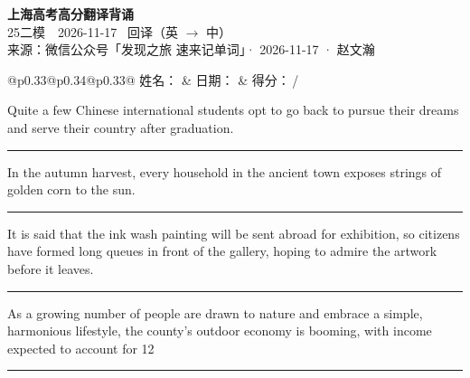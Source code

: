 \documentclass[11pt,a4paper]{article}
\newcommand{\num}[1]{\makebox[1.9em][r]{#1.}\hspace{0.3em}}
\newcommand{\wline}{\noindent\rule{\linewidth}{0.4pt}}
\begin{document}
\pagestyle{plain}
\begin{center}
{\LARGE\bfseries 上海高考高分翻译背诵 }\\[0.25em]
{\large 25二模　2026-11-17 \quad\ 回译（英 $\to$ 中）}\\[0.35em]
{\footnotesize 来源：微信公众号「发现之旅 速来记单词」· 2026-11-17 · 赵文瀚}
\end{center}

\vspace{0.4em}
\noindent\begin{tabular}{@{}p{0.33\textwidth}@{}p{0.34\textwidth}@{}p{0.33\textwidth}@{}}
姓名：\underline{\hspace{2.0cm}} & 日期：\underline{\hspace{2.0cm}} & 得分：\underline{\hspace{1.4cm}}\,/ \\
\end{tabular}

\vspace{0.5em}

\vspace{0.8em}
\num{1}Quite a few Chinese international students opt to go back to pursue their dreams and serve their country after graduation.

\vspace{0.25em}

\wline

\num{2}In the autumn harvest, every household in the ancient town exposes strings of golden corn to the sun.

\vspace{0.25em}

\wline

\num{3}It is said that the ink wash painting will be sent abroad for exhibition, so citizens have formed long queues in front of the gallery, hoping to admire the artwork before it leaves.

\vspace{0.25em}

\wline

\num{4}As a growing number of people are drawn to nature and embrace a simple, harmonious lifestyle, the county’s outdoor economy is booming, with income expected to account for 12%

\vspace{0.25em}

\wline
\end{document}
